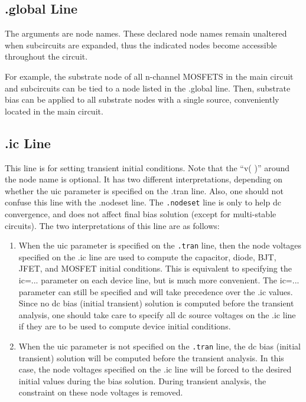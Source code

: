 
\subsection{{\vt .global} Line}

The arguments are node names.  These declared node names remain
unaltered when subcircuits are expanded, thus the indicated nodes
become accessible throughout the circuit.

For example, the substrate node of all n-channel MOSFETS in the main
circuit and subcircuits can be tied to a node listed in the {\vt
.global} line.  Then, substrate bias can be applied to all substrate
nodes with a single source, conveniently located in the main circuit.

\subsection{{\vt .ic} Line}
\label{icline}

This line is for setting transient initial conditions.  Note that the
``{\vt v( )}'' around the node name is optional.  It has two different
interpretations, depending on whether the {\vt uic} parameter is
specified on the {\vt .tran} line.  Also, one should not confuse this
line with the {\vt .nodeset} line.  The {\tt .nodeset} line is only to
help dc convergence, and does not affect final bias solution (except
for multi-stable circuits).  The two interpretations of this line are
as follows:

\begin{enumerate}
\item{ When the {\vt uic} parameter is specified on the {\tt .tran} line,
 then the node voltages specified on the {\vt .ic} line are used to
 compute the capacitor, diode, BJT, JFET, and MOSFET initial
 conditions.  This is equivalent to specifying the {\vt
 ic=}... parameter on each device line, but is much more convenient.
 The {\vt ic=}...  parameter can still be specified and will take
 precedence over the {\vt .ic} values.  Since no dc bias (initial
 transient) solution is computed before the transient analysis, one
 should take care to specify all dc source voltages on the {\vt .ic}
 line if they are to be used to compute device initial conditions. }

\item{ When the {\vt uic} parameter is not specified on the {\tt .tran}
 line, the dc bias (initial transient) solution will be computed
 before the transient analysis.  In this case, the node voltages
 specified on the {\vt .ic} line will be forced to the desired initial
 values during the bias solution.  During transient analysis, the
 constraint on these node voltages is removed. }
\end{enumerate}

